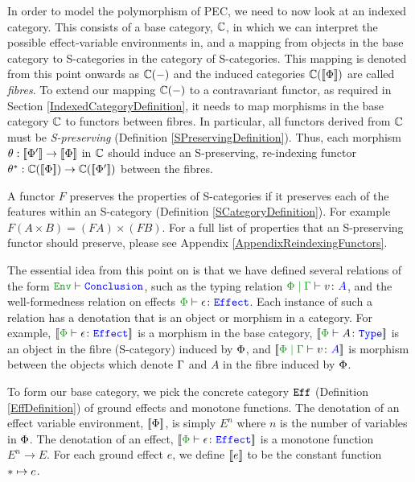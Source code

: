 \documentclass{Report}
\begin{document}
In order to model the polymorphism of PEC, we need to now look at an indexed category. This consists of a base category, $\C$, in which we can interpret the possible effect-variable environments in, and a mapping from objects in the base category to S-categories in the category of S-categories. This mapping is denoted from this point onwards as $\C(-)$ and the induced categories $\C(\deno{\P})$ are called \textit{fibres}. To extend our mapping $\C(-)$ to a contravariant functor, as required in Section \ref{IndexedCategoryDefinition}, it needs to map morphisms in the base category $\C$ to functors between fibres. In particular, all functors derived from $\C$ must be \textit{S-preserving} (Definition \ref{SPreservingDefinition}). Thus, each morphism $\theta: \deno{\P'}\rightarrow\deno{\P}$ in $\C$ should induce an S-preserving, re-indexing functor $\theta\star: \C(\deno{\P})\rightarrow\C(\deno{\P'})$ between the fibres.


\begin{framed}
    \begin{definition}\label{SPreservingDefinition}
        A functor $F$ preserves the properties of S-categories if it preserves each of the features within an S-category (Definition \ref{SCategoryDefinition}).  For example $F(A\times B) = (FA)\times (FB)$. For a full list of properties that an S-preserving functor should preserve, please see Appendix \ref{AppendixReindexingFunctors}.
    \end{definition}
\end{framed}

The essential idea from this point on is that we have defined several relations of the form $\wellformed{\texttt{Env}}{\texttt{Conclusion}}$, such as the typing relation $\gpetyperelation{v}{A}$, and the well-formedness relation on effects $\wellformedeffect{\P}{\e}$. Each instance of such a relation has a denotation that is an object or morphism in a category. For example, $\deno{\typerelation{\P}{\e}{\effect}}$ is a morphism in the base category, $\deno{\typerelation{\P}{A}{\type}}$ is an object in the fibre (S-category) induced by $\P$, and $\deno{\gpetyperelation{v}{A}}$ is morphism between the objects which denote $\G$ and $A$ in the fibre induced by $\P$.

To form our base category, we pick the concrete category $\Eff$ (Definition \ref{EffDefinition}) of ground effects and monotone functions. The denotation of an effect variable environment, $\deno{\P}$, is simply $E^n$ where $n$ is the number of variables in $\P$. The denotation of an effect, $\deno{\wellformedeffect{\P}{\e}}$ is a monotone function $E^n\rightarrow E$. For each ground effect $e$, we define $\deno{e}$ to be the constant function $\singleton \mapsto e$.
\end{document}
